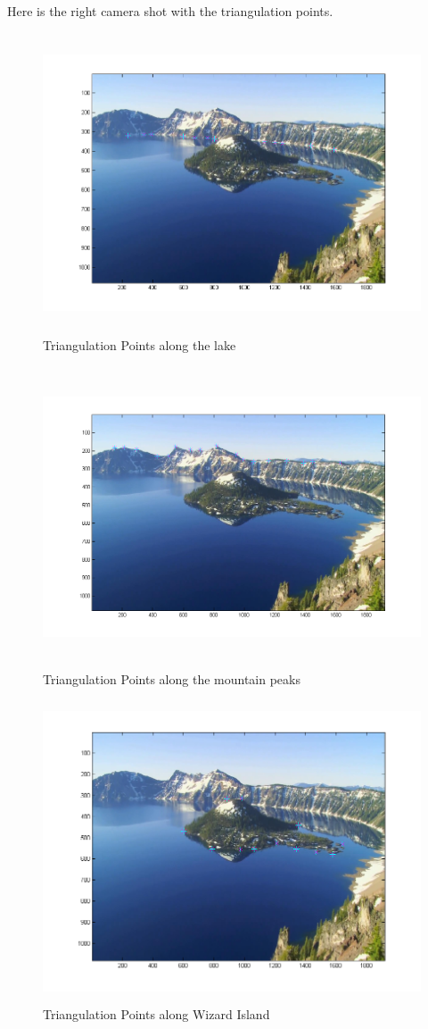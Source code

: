 \documentclass[11pt,psfig]{article}
\begin{document}
Here is the right camera shot with the triangulation points.
\begin{figure}[H]
\centering
\includegraphics[height=3.5in]{sfmResults1/photoRight_lakeRidgePoints.png}
\caption{Triangulation Points along the lake}
\end{figure}
\begin{figure}[H]
\centering
\includegraphics[height=3.5in]{sfmResults1/photoRight_topRidgePoints.png}
\caption{Triangulation Points along the mountain peaks}
\end{figure}
\begin{figure}[H]
\centering
\includegraphics[height=3.5in]{sfmResults1/photoRight_wizardIslandPoints.png}
\caption{Triangulation Points along Wizard Island}
\end{figure}
\end{document}
